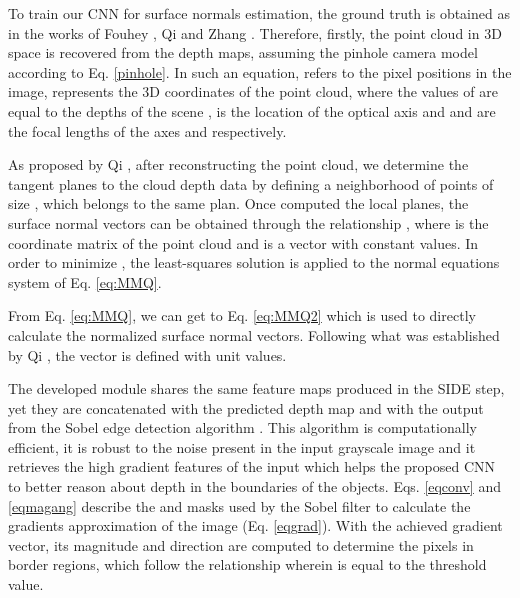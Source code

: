 \documentclass[5p]{elsarticle}
\begin{document}
To train our CNN for surface normals estimation, the ground truth is obtained as in the works of Fouhey \etal\cite{fouhey2013data}, Qi \etal\cite{qi2018geonet} and Zhang \etal\cite{zhang2019pattern}. Therefore, firstly, the point cloud in 3D space is recovered from the depth maps, assuming the pinhole camera model according to Eq. \ref{pinhole}. In such an equation,  refers to the pixel positions in the image,  represents the 3D coordinates of the point cloud, where the values of  are equal to the depths of the scene ,  is the location of the optical axis and  and  are the focal lengths of the axes  and  respectively.



As proposed by Qi \etal\cite{qi2018geonet}, after reconstructing the point cloud, we determine the tangent planes to the cloud depth data by defining a neighborhood of points of size , which belongs to the same plan. Once computed the local planes, the surface normal vectors  can be obtained through the relationship , where  is the coordinate matrix of the point cloud and  is a vector with constant values. In order to minimize , the least-squares solution  is applied to the normal equations system of Eq. \ref{eq:MMQ}.



From Eq. \ref{eq:MMQ}, we can get to Eq. \ref {eq:MMQ2} which is used to directly calculate the normalized surface normal vectors. Following what was established by Qi \etal\cite{qi2018geonet}, the vector  is defined with unit values.



The developed module shares the same feature maps produced in the SIDE step, yet they are concatenated with the predicted depth map and with the output from the Sobel edge detection algorithm \cite{nixon2019feature}. This algorithm is computationally efficient, it is robust to the noise present in the input grayscale image and it retrieves the high gradient features of the input which helps the proposed CNN to better reason about depth in the boundaries of the objects. Eqs. \ref{eqconv} and \ref{eqmagang} describe the  and  masks used by the Sobel filter to calculate the gradients approximation of the image  (Eq. \ref{eqgrad}). With the achieved gradient vector, its magnitude  and direction  are computed to determine the pixels in border regions, which follow the relationship  wherein  is equal to the threshold value. 
\end{document}
